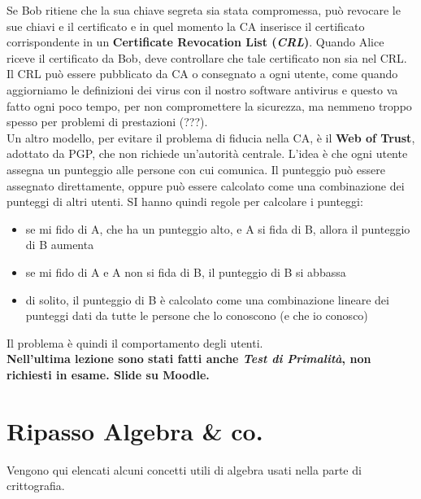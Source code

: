 \documentclass[a4paper,12pt, oneside]{book}
\begin{document}
Se Bob ritiene che la sua chiave segreta sia stata compromessa, può revocare le
sue chiavi e il certificato e in quel momento la CA inserisce il certificato
corrispondente in un \textbf{Certificate Revocation List (\textit{CRL})}. Quando
Alice riceve il certificato da Bob, deve controllare che tale certificato non
sia nel CRL. Il CRL può essere pubblicato da CA o consegnato a ogni utente, come
quando aggiorniamo le definizioni dei virus con il nostro software antivirus e
questo va fatto ogni poco tempo, per non compromettere la sicurezza, ma nemmeno
troppo spesso per problemi di prestazioni (???).\\
Un altro modello, per evitare il problema di fiducia nella CA, è il \textbf{Web
  of Trust}, adottato da PGP, che non richiede un'autorità centrale. L'idea è
che ogni utente assegna un punteggio alle persone con cui comunica. Il punteggio
può essere assegnato direttamente, oppure può essere calcolato come una
combinazione dei punteggi di altri utenti. SI hanno quindi regole per calcolare
i punteggi:
\begin{itemize}
  \item se mi fido di A, che ha un punteggio alto, e A si fida di B, allora il
  punteggio di B aumenta  
  \item se mi fido di A e A non si fida di B, il punteggio di B si abbassa 
  \item di solito, il punteggio di B è calcolato come una combinazione lineare
  dei punteggi dati da tutte le persone che lo conoscono (e che io conosco)  
\end{itemize}
Il problema è quindi il comportamento degli utenti.\\
\textbf{Nell'ultima lezione sono stati fatti anche \textit{Test di Primalità},
  non richiesti in esame. Slide su Moodle.}
\chapter{Ripasso Algebra \& co.}
Vengono qui elencati alcuni concetti utili di algebra usati nella parte di
crittografia.
\end{document}
